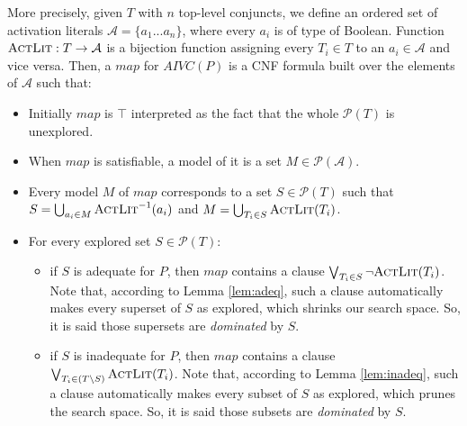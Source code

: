 More precisely, given $T$ with $n$ top-level conjuncts,
we define an ordered
set of activation literals $\mathcal{A} = \{a_1...a_n\}$, where every $a_i$ is of type of Boolean. Function $\textsc{ActLit} : T \rightarrow \mathcal{A}$
is a bijection function assigning every $T_i \in T$ to an $a_i \in \mathcal{A}$ and vice versa.
Then, a $map$ for $AIVC(P)$ is a CNF formula built over the elements of $\mathcal{A}$ such that:
\begin{itemize}
  \item Initially $map$ is $\top$ interpreted as the fact that the whole $\mathcal{P}(T)$ is unexplored. 
  \item When $map$ is satisfiable, a model of it is a set
  $M \in \mathcal{P}(\mathcal{A})$.
  \item Every model $M$ of $map$ corresponds to a set $S \in \mathcal{P}(T)$ such that
$S = \bigcup_{a_i \in M} \textsc{ActLit} ^{-1} (a_i)$ and $M = \bigcup_{T_i \in S} \textsc{ActLit}(T_i)$.
  \item For every explored set $S \in \mathcal{P}(T)$:
  \begin{itemize}
    \item if $S$ is adequate for $P$, then $map$ contains a clause $\bigvee_{T_{i}\in S} \neg {\textsc{ActLit}(T_i)}$. Note that, according to Lemma \ref{lem:adeq}, such a clause automatically makes every superset of $S$ as explored, which shrinks our search space. So, it is said those supersets are \emph{dominated} by $S$.
    \item if $S$ is inadequate for $P$, then $map$ contains a clause $\bigvee_{T_{i}\in (T \setminus S)} \textsc{ActLit} (T_i)$. Note that, according to Lemma \ref{lem:inadeq}, such a clause automatically makes every subset of $S$ as explored, which prunes the search space. So, it is said those subsets are \emph{dominated} by $S$.
  \end{itemize}
\end{itemize}


